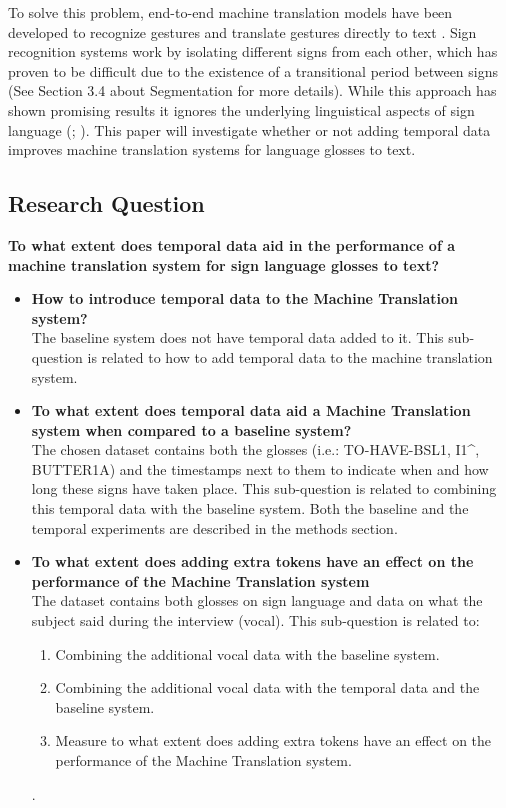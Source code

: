 To solve this problem, end-to-end machine translation models have been developed to recognize gestures and translate gestures directly to text \cite{de2020sign}. Sign recognition systems work by isolating different signs from each other, which has proven to be difficult due to the existence of a transitional period between signs \cite{konradoffentliches}  (See Section 3.4 about Segmentation for more details). While this approach has shown promising results it ignores the underlying linguistical aspects of sign language (\citealp{camgoz2018neural}; \citealp{perniss2007}). This paper will investigate whether or not adding temporal data improves machine translation systems for language glosses to text.

\subsection{Research Question}

\textbf{To what extent does temporal data aid in the performance of a machine translation system for sign language glosses to text?}

\begin{itemize}
    \item \textbf{How to introduce temporal data to the Machine Translation system?} \\
    The baseline system does not have temporal data added to it. This sub-question is related to how to add temporal data to the machine translation system.
    \item \textbf{To what extent does temporal data aid a Machine Translation system when compared to a baseline system?} \\
    The chosen dataset \cite{dgscorpus_3} contains both the glosses (i.e.: TO-HAVE-BSL1, I1\textasciicircum, BUTTER1A) and the timestamps next to them to indicate when and how long these signs have taken place. This sub-question is related to combining this temporal data with the baseline system. Both the baseline and the temporal experiments are described in the methods section.
    \item \textbf{To what extent does adding extra tokens have an effect on the performance of the Machine Translation system} \\
    The dataset contains both glosses on sign language and data on what the subject said during the interview (vocal). This sub-question is related to:
    \begin{enumerate}
        \item Combining the additional vocal data with the baseline system.
        \item Combining the additional vocal data with the temporal data and the baseline system.
        \item Measure to what extent does adding extra tokens have an effect on the performance of the Machine Translation system.
    \end{enumerate}.
\end{itemize}

